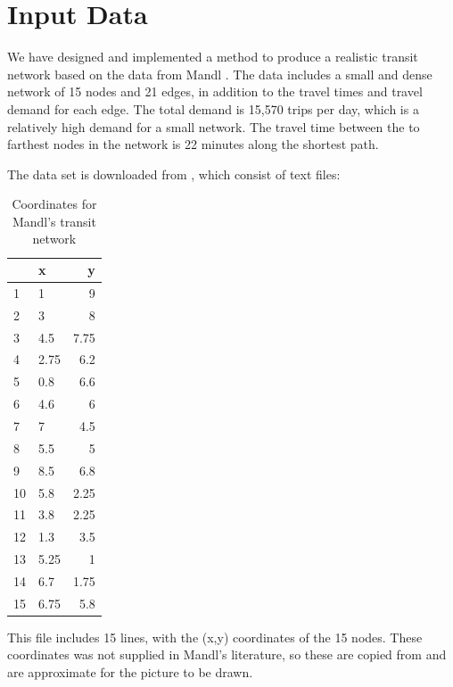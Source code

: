 \section{Input Data}
\label{sec:inputData}

We have designed and implemented a method to produce a realistic transit network based on the data from Mandl \citep{mandl79}. The data includes a small and dense network of 15 nodes and 21 edges, in addition to the travel times and travel demand for each edge. The total demand is 15,570 trips per day, which is a relatively high demand for a small network. The travel time between the to farthest nodes in the network is 22 minutes along the shortest path. 

The data set is downloaded from \citet{mumford13}, which consist of text files:

\begin{table}[H]
    \begin{center}
        \begin{tabular}{|l|lr|}
     	\hline
     	~ & x & y \\
     	\hline
        1 & 1 & 9 \\
        2 & 3 & 8 \\
        3 & 4.5 & 7.75 \\
        4 & 2.75 & 6.2 \\
        5 & 0.8 & 6.6 \\
        6 & 4.6 & 6 \\
        7 & 7 & 4.5 \\
        8 & 5.5 & 5 \\
        9 & 8.5 & 6.8 \\
        10 & 5.8 & 2.25 \\
        11 & 3.8 & 2.25 \\
        12 & 1.3 & 3.5 \\
    	13 & 5.25 & 1 \\
    	14 & 6.7 & 1.75 \\
    	15 & 6.75 & 5.8 \\
    	\hline
        \end{tabular}
    \end{center}
    \caption {Coordinates for Mandl's transit network}
    \label{table:MandlCoords}
    This file includes 15 lines, with the (x,y) coordinates of the 15 nodes. These coordinates was not supplied in Mandl's literature, so these are copied from \citet{mumford13} and are approximate for the picture to be drawn.
\end{table}

